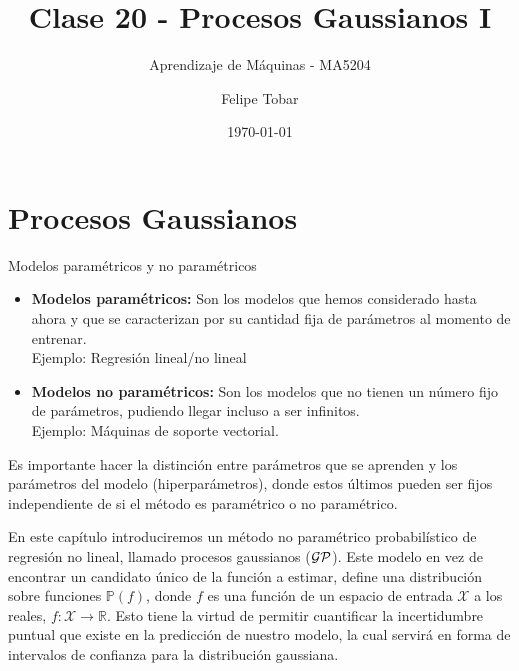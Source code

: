 \documentclass[handout, 9pt]{beamer}
\title{Clase 20 - Procesos Gaussianos I}
\subtitle{Aprendizaje de Máquinas - MA5204}
\date{\today}
\author{Felipe Tobar}
\institute{Department of Mathematical Engineering \&\\ Center for Mathematical Modelling\\Universidad de Chile}
\begin{document}
\begin{frame}
  \titlepage
\end{frame}

\section{Procesos Gaussianos}

\begin{frame}{Modelos paramétricos y no paramétricos}
\begin{itemize}
  \item \textbf{Modelos paramétricos: } Son los modelos que hemos considerado hasta ahora y que se caracterizan por su cantidad fija de parámetros al momento de entrenar. \\ \pause 
  Ejemplo: Regresión lineal/no lineal \pause 
  \item \textbf{Modelos no paramétricos: } Son los modelos que no tienen un número fijo de parámetros, pudiendo llegar incluso a ser infinitos. \\ \pause 
  Ejemplo: Máquinas de soporte vectorial. \pause 

\end{itemize}

\begin{observacion}
Es importante hacer la distinción entre parámetros que se aprenden y los parámetros del modelo (hiperparámetros), donde estos últimos pueden ser fijos independiente de si el método es paramétrico o no paramétrico.
\end{observacion} \pause 

En este capítulo introduciremos un método no paramétrico probabilístico de regresión no lineal, llamado procesos gaussianos ($\mathcal{GP}$). Este modelo en vez de encontrar un candidato único de la función a estimar, define una distribución sobre funciones $\mathbb{P}(f)$, donde $f$ es una función de un espacio de entrada $\mathcal{X}$ a los reales, $f: \mathcal{X} \rightarrow \mathbb{R}$. Esto tiene la virtud de permitir cuantificar la incertidumbre puntual que existe en la predicción de nuestro modelo, la cual servirá en forma de intervalos de confianza para la distribución gaussiana.

\end{frame}
\end{document}
